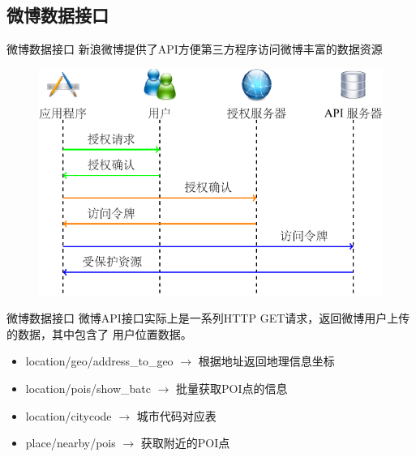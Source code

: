 \subsection{微博数据接口}

\begin{frame}[c]{微博数据接口}
    新浪微博提供了API方便第三方程序访问微博丰富的数据资源

    \begin{figure}
        \includegraphics[scale=0.8]{figures/api.pdf}
    \end{figure}
\end{frame}

\begin{frame}[c,c]{微博数据接口}
    微博API接口实际上是一系列HTTP GET请求，返回微博用户上传的数据，其中包含了
    用户位置数据。

    \vspace{0.5em}
    \pause
    \begin{itemize}
    \item location/geo/address\_to\_geo $\rightarrow$  根据地址返回地理信息坐标 
    \item location/pois/show\_batc $\rightarrow$ 批量获取POI点的信息
    \item location/citycode $\rightarrow$ 城市代码对应表
    \item place/nearby/pois $\rightarrow$ 获取附近的POI点
    \end{itemize}
\end{frame}

